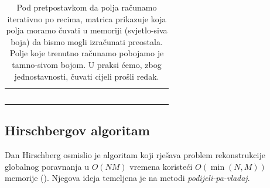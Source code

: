 \documentclass[times, utf8, zavrsni]{fer}
\begin{document}
\begin{table}
\centering
\begin{tabularx}{400pt}{|R|R|R|R|R|R|R|R|R|R|R|R|R|R|R|R|R|R|R|R|}
 \hline
  &  &  &  &  &  &  &  &  &  &  &  &  &  &  &  &  &  &  &  \\ \hline
  &  &  &  &  &  &  &  &  &  &  &  &  &  &  &  &  &  &  &  \\ \hline
  &  &  &  &  &  &  &  &  &  &  &  &  &  &  &  &  &  &  &  \\ \hline
  &  &  &  &  &  &  &  &   &   &   &   &   &   &   &   &   &   &   &   \\ \hline
   &   &   &   &   &   &   &   &   &   &  &  &  &  &  &  &  &  &  &  \\ \hline
  &  &  &  &  &  &  &  &  &  &  &  &  &  &  &  &  &  &  &  \\ \hline
\end{tabularx}
\caption[Memorijska optimizacija]{Pod pretpostavkom da polja računamo iterativno 
po recima, matrica prikazuje koja polja moramo čuvati u
memoriji (svjetlo-siva boja) da bismo mogli izračunati preostala.
Polje koje trenutno računamo
pobojamo je tamno-sivom bojom. U praksi ćemo, zbog jednostavnosti,
čuvati cijeli prošli redak.}
\label{table:memopt}
\end{table}

\subsection{Hirschbergov algoritam}
Dan Hirschberg osmislio je algoritam koji rješava problem rekonstrukcije
globalnog poravnanja u $O(NM)$ vremena koristeći $O(\min(N, M))$ memorije
(\citealp{hirschberg}).
Njegova ideja temeljena je na metodi \textit{podijeli-pa-vladaj}.
\end{document}
